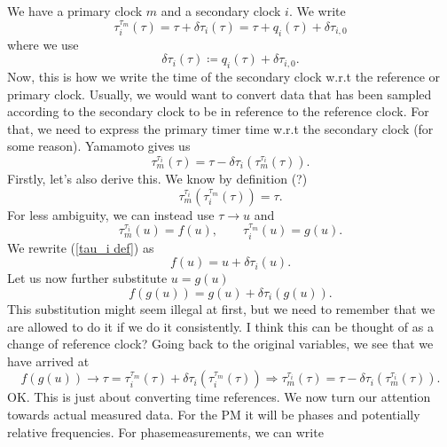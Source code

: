 \documentclass[11pt]{article}
\begin{document}
We have a primary clock $m$ and a secondary clock $i$. We write
\begin{equation}\label{tau_i def}
    \tau_i^{\tau_m}(\tau) = \tau + \delta\tau_i(\tau) = \tau + q_i(\tau) + \delta\tau_{i,0}
\end{equation}
where we use 
\begin{equation*}
    \delta\tau_i(\tau) \coloneqq q_i(\tau) + \delta\tau_{i,0}.
\end{equation*}
Now, this is how we write the time of the secondary clock w.r.t the reference or primary clock. Usually, we would want to convert data that has been sampled according to the secondary clock to be in reference to the reference clock. For that, we need to express the primary timer time w.r.t the secondary clock (for some reason). Yamamoto gives us
\begin{equation*}
    \tau_m^{\tau_i}(\tau) = \tau - \delta\tau_i\!\left(\tau_m^{\tau_i}(\tau)\right).
\end{equation*}
Firstly, let's also derive this. We know by definition (?)
\begin{equation*}
    \tau_m^{\tau_i}\!\left(\tau_i^{\tau_m}(\tau)\right) = \tau.
\end{equation*}
For less ambiguity, we can instead use $\tau \rightarrow u$ and 
\begin{equation*}
    \tau_m^{\tau_i}(u) = f(u), \qquad \tau_i^{\tau_m}(u)=g(u).
\end{equation*}
We rewrite (\ref{tau_i def}) as
\begin{equation*}
    f(u)=u+\delta\tau_i(u).
\end{equation*}
Let us now further substitute $u=g(u)$
\begin{equation*}
    f(g(u))=g(u)+\delta\tau_i(g(u)).
\end{equation*}
This substitution might seem illegal at first, but we need to remember that we are allowed to do it if we do it consistently. I think this can be thought of as a change of reference clock? Going back to the original variables, we see that we have arrived at
\begin{equation*}
    f(g(u))\rightarrow \tau = \tau_i^{\tau_m}(\tau)+\delta\tau_i(\tau_i^{\tau_m}(\tau))\Rightarrow \tau_m^{\tau_i}(\tau) = \tau - \delta\tau_i\!\left(\tau_m^{\tau_i}(\tau)\right).
\end{equation*}
OK. This is just about converting time references. We now turn our attention towards actual measured data. For the PM it will be phases and potentially relative frequencies. For phasemeasurements, we can write
\end{document}
